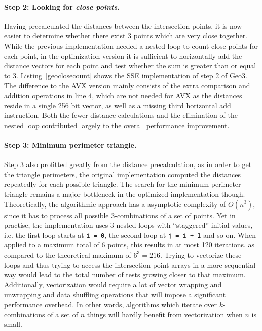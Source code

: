 
\paragraph{Step 2: Looking for \emph{close points}.} Having precalculated the distances between the intersection points, it is now easier to determine whether there exist 3 points which are very close together. While the previous implementation needed a nested loop to count close points for each point, in the optimization version it is sufficient to horizontally add the distance vectors for each point and test whether the sum is greater than or equal to 3. Listing~\ref{geoclosecount} shows the SSE implementation of step 2 of Geo3. The difference to the AVX version mainly consists of the extra comparison and addition operations in line 4, which are not needed for AVX as the distances reside in a single 256 bit vector, as well as a missing third horizontal add instruction. Both the fewer distance calculations and the elimination of the nested loop contributed largely to the overall performance improvement.


\paragraph{Step 3: Minimum perimeter triangle.} Step 3 also profitted greatly from the distance precalculation, as in order to get the triangle perimeters, the original implementation computed the distances repeatedly for each possible triangle. The search for the minimum perimeter triangle remains a major bottleneck in the optimized implementation though. Theoretically, the algorithmic approach has a asymptotic complexity of $O(n^{3})$, since it has to process all possible 3-combinations of a set of points. Yet in practise, the implementation uses 3 nested loops with ``staggered'' initial values, i.e. the first loop starts at \texttt{i = 0}, the second loop at \texttt{j = i + 1} and so on. When applied to a maximum total of 6 points, this results in at most 120 iterations, as compared to the theoretical maximum of $6^{3} = 216$. Trying to vectorize these loops and thus trying to access the intersection point arrays in a more sequential way would lead to the total number of tests growing closer to that maximum. Additionally, vectorization would require a lot of vector wrapping and unwrapping and data shuffling operations that will impose a significant performance overhead. In other words, algorithms which iterate over $k$-combinations of a set of $n$ things will hardly benefit from vectorization when $n$ is small.


